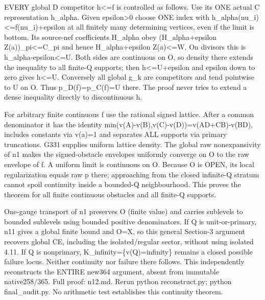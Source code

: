 \documentclass[11pt]{article}
\begin{document}
EVERY global D competitor h<=f is controlled as follows. Use its ONE actual C representation h\_alpha. Given epsilon>0 choose ONE index with h\_alpha(nu\_i)<=f(nu\_i)+epsilon at all finitely many determining vertices, even if the limit is bottom. Its source-nef coefficients H\_alpha obey (H\_alpha+epsilon Z(a))\_pi<=C\_pi and hence H\_alpha+epsilon Z(a)<=W. On divisors this is h\_alpha-epsilon<=U. Both sides are continuous on O, so density there extends the inequality to all finite-Q supports; then h<=U+epsilon and epsilon down to zero gives h<=U. Conversely all global g\_k are competitors and tend pointwise to U on O. Thus p\_D(f)=p\_C(f)=U there. The proof never tries to extend a dense inequality directly to discontinuous h.

For arbitrary finite continuous f use the rational signed lattice. After a common denominator it has the identity min(v(A)-v(B),v(C)-v(D))=v(AD+CB)-v(BD), includes constants via v(a)=1 and separates ALL supports via primary truncations. G331 supplies uniform lattice density. The global raw nonexpansivity of n1 makes the signed-obstacle envelopes uniformly converge on O to the raw envelope of f. A uniform limit is continuous on O. Because O is OPEN, its local regularization equals raw p there; approaching from the closed infinite-Q stratum cannot spoil continuity inside a bounded-Q neighbourhood. This proves the theorem for all finite continuous obstacles and all finite-Q supports.

One-gauge transport of n1 preserves O (finite value) and carries sublevels to bounded sublevels using bounded positive denominators. If Q is unit-or-primary, n11 gives a global finite bound and O=X, so this general Section-3 argument recovers global CE, including the isolated/regular sector, without using isolated 4.11. If Q is nonprimary, K\_infinity=\{v(Q)=infinity\} remains a closed possible failure locus. Neither continuity nor failure there follows. This independently reconstructs the ENTIRE new364 argument, absent from immutable native258/365. Full proof: n12.md. Rerun python reconstruct.py; python final\_audit.py. No arithmetic test establishes this continuity theorem.
\end{document}
